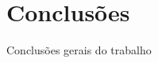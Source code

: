 \documentclass[twoside,conference,a4paper]{IEEEtran}
\begin{document}



\section{Conclusões}

Conclusões gerais do trabalho









\vspace{20ex}

\vspace{3ex}
\end{document}
